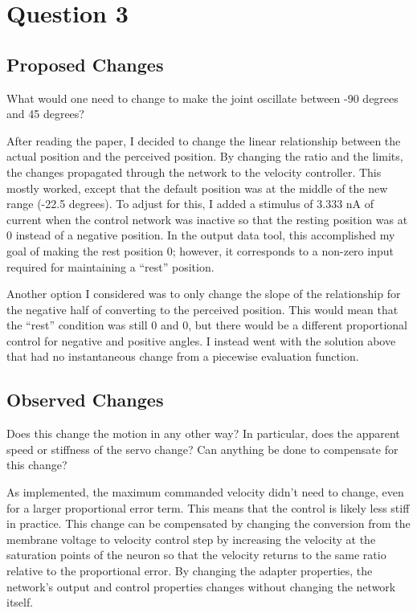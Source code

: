 \section{Question 3}

\subsection{Proposed Changes}

What would one need to change to make the joint oscillate between -90 degrees and 45
degrees?

After reading the paper, I decided to change the linear relationship between the actual position and the perceived position. By changing the ratio and the limits, the changes propagated through the network to the velocity controller. This mostly worked, except that the default position was at the middle of the new range (-22.5 degrees). To adjust for this, I added a stimulus of 3.333 nA of current when the control network was inactive so that the resting position was at 0 instead of a negative position. In the output data tool, this accomplished my goal of making the rest position 0; however, it corresponds to a non-zero input required for maintaining a ``rest'' position.

Another option I considered was to only change the slope of the relationship for the negative half of converting to the perceived position. This would mean that the ``rest'' condition was still 0 and 0, but there would be a different proportional control for negative and positive angles. I instead went with the solution above that had no instantaneous change from a piecewise evaluation function.

\subsection{Observed Changes}

Does this change the motion in any other way? In particular, does the apparent speed or stiffness of
the servo change? Can anything be done to compensate for this change?

As implemented, the maximum commanded velocity didn't need to change, even for a larger proportional error term. This means that the control is likely less stiff in practice. This change can be compensated by changing the conversion from the membrane voltage to velocity control step by increasing the velocity at the saturation points of the neuron so that the velocity returns to the same ratio relative to the proportional error. By changing the adapter properties, the network's output and control properties changes without changing the network itself.

